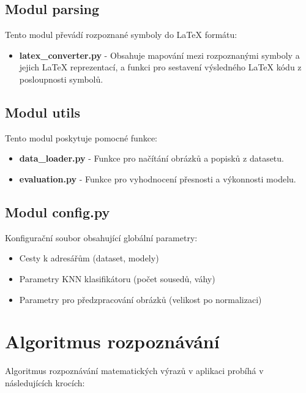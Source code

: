 \subsection{Modul parsing}

Tento modul převádí rozpoznané symboly do LaTeX formátu:

\begin{itemize}
    \item \textbf{latex\_converter.py} - Obsahuje mapování mezi rozpoznanými symboly a jejich LaTeX reprezentací, a funkci pro sestavení výsledného LaTeX kódu z posloupnosti symbolů.
\end{itemize}

\subsection{Modul utils}

Tento modul poskytuje pomocné funkce:

\begin{itemize}
    \item \textbf{data\_loader.py} - Funkce pro načítání obrázků a popisků z datasetu.
    \item \textbf{evaluation.py} - Funkce pro vyhodnocení přesnosti a výkonnosti modelu.
\end{itemize}

\subsection{Modul config.py}

Konfigurační soubor obsahující globální parametry:

\begin{itemize}
    \item Cesty k adresářům (dataset, modely)
    \item Parametry KNN klasifikátoru (počet sousedů, váhy)
    \item Parametry pro předzpracování obrázků (velikost po normalizaci)
\end{itemize}

\section{Algoritmus rozpoznávání}

Algoritmus rozpoznávání matematických výrazů v aplikaci probíhá v následujících krocích:

